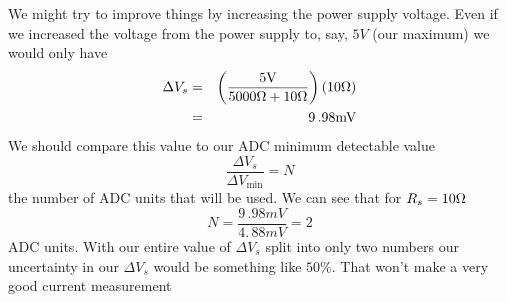 We might try to improve things by increasing the power supply voltage. Even
if we increased the voltage from the power supply to, say, $5\unit{V}$ (our
maximum) we would only have 
\begin{eqnarray*}
\Delta V_{s} &=&\left( \frac{5\unit{V}}{5000\unit{%
\Omega%
}+10\unit{%
\Omega%
}}\right) \left( 10\unit{%
\Omega%
}\right) \\
&=&9\,.98\unit{mV}
\end{eqnarray*}%
We should compare this value to our ADC minimum detectable value 
\begin{equation*}
\frac{\Delta V_{s}}{\Delta V_{\min }}=N
\end{equation*}%
the number of ADC units that will be used. We can see that for $R_{s}=10%
\unit{%
\Omega%
}$ 
\begin{equation*}
N=\frac{9\,.98\unit{mV}}{4.\,\allowbreak 88\unit{mV}}=2
\end{equation*}%
ADC units. With our entire value of $\Delta V_{s}$ split into only two
numbers our uncertainty in our $\Delta V_{s}$ would be something like $50\%.$
That won't make a very good current measurement

